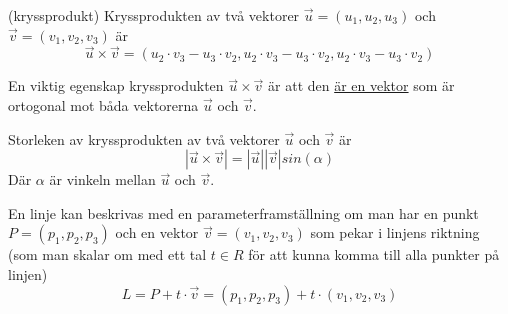 \documentclass[../main.tex]{subfiles}
\begin{document}
\begin{formel}{(kryssprodukt)}
\label{kryssprod} 
Kryssprodukten av två vektorer $\vec{u} = (u_1, u_2, u_3)$ och $\vec{v} = (v_1, v_2, v_3)$ är
\[\vec{u}\times \vec{v} = (u_2\cdot v_3 - u_3\cdot v_2, u_2\cdot v_3 - u_3\cdot v_2, u_2\cdot v_3 - u_3\cdot v_2)\]

En viktig egenskap kryssprodukten $\vec{u}\times\vec{v}$ är att den \underline{är en vektor} som är ortogonal mot båda vektorerna $\vec{u}$ och $\vec{v}$.
\end{formel}


\begin{formel}
\label{kryssprodsize} 
Storleken av kryssprodukten av två vektorer $\vec{u}$ och $\vec{v}$ är
\[|\vec{u}\times \vec{v}| = |\vec{u}||\vec{v}|sin(\alpha)\]
Där $\alpha$ är vinkeln mellan $\vec{u}$ och $\vec{v}$.
\end{formel}


\begin{formel}
\label{parameterlinje} 
En linje kan beskrivas med en parameterframställning om man har en punkt $P = (p_1, p_2, p_3)$ och en vektor $\vec{v}=(v_1, v_2, v_3)$ som pekar i linjens riktning (som man skalar om med ett tal $t \in R$ för att kunna komma till alla punkter på linjen)
\[L = P + t \cdot \vec{v} = (p_1, p_2, p_3) + t\cdot (v_1, v_2, v_3)\]
\end{formel}
\end{document}
